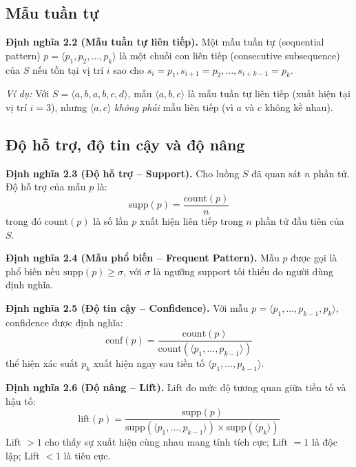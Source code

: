 \documentclass[a4paper,12pt]{report}
\begin{document}
\subsection{Mẫu tuần tự}
\textbf{Định nghĩa 2.2 (Mẫu tuần tự liên tiếp).} Một mẫu tuần tự (sequential pattern) $p = \langle p_1, p_2, \dots, p_k \rangle$ là một chuỗi con liên tiếp (consecutive subsequence) của $S$ nếu tồn tại vị trí $i$ sao cho $s_i = p_1, s_{i+1} = p_2, \dots, s_{i+k-1} = p_k$.

\textit{Ví dụ:} Với $S = \langle a, b, a, b, c, d \rangle$, mẫu $\langle a, b, c \rangle$ là mẫu tuần tự liên tiếp (xuất hiện tại vị trí $i = 3$), nhưng $\langle a, c \rangle$ \textit{không phải} mẫu liên tiếp (vì $a$ và $c$ không kề nhau).

\subsection{Độ hỗ trợ, độ tin cậy và độ nâng}

\textbf{Định nghĩa 2.3 (Độ hỗ trợ -- Support).} Cho luồng $S$ đã quan sát $n$ phần tử. Độ hỗ trợ của mẫu $p$ là:
\begin{equation}
    \text{supp}(p) = \frac{\text{count}(p)}{n}
\end{equation}
trong đó $\text{count}(p)$ là số lần $p$ xuất hiện liên tiếp trong $n$ phần tử đầu tiên của $S$.

\textbf{Định nghĩa 2.4 (Mẫu phổ biến -- Frequent Pattern).} Mẫu $p$ được gọi là phổ biến nếu $\text{supp}(p) \geq \sigma$, với $\sigma$ là ngưỡng support tối thiểu do người dùng định nghĩa.

\textbf{Định nghĩa 2.5 (Độ tin cậy -- Confidence).} Với mẫu $p = \langle p_1, \dots, p_{k-1}, p_k \rangle$, confidence được định nghĩa:
\begin{equation}
    \text{conf}(p) = \frac{\text{count}(p)}{\text{count}(\langle p_1, \dots, p_{k-1} \rangle)}
\end{equation}
thể hiện xác suất $p_k$ xuất hiện ngay sau tiền tố $\langle p_1, \dots, p_{k-1} \rangle$.

\textbf{Định nghĩa 2.6 (Độ nâng -- Lift).} Lift đo mức độ tương quan giữa tiền tố và hậu tố:
\begin{equation}
    \text{lift}(p) = \frac{\text{supp}(p)}{\text{supp}(\langle p_1, \dots, p_{k-1} \rangle) \times \text{supp}(\langle p_k \rangle)}
\end{equation}
Lift $> 1$ cho thấy sự xuất hiện cùng nhau mang tính tích cực; Lift $= 1$ là độc lập; Lift $< 1$ là tiêu cực.
\end{document}
